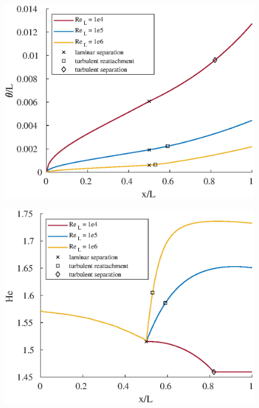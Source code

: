 \begin{figure}[H]
\centering
\includegraphics[scale=0.8]{graphs/e6g3.eps}
\caption{}
\label{e6g3}
\end{figure}

\begin{figure}[H]
\centering
\includegraphics[scale=0.8]{graphs/e6g4.eps}
\caption{}
\label{e6g4}
\end{figure}



